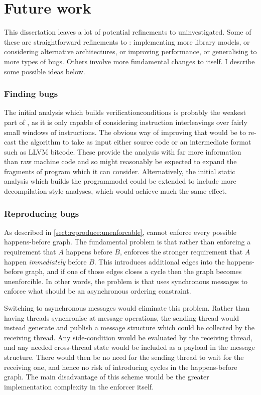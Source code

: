 \chapter{Future work}

This dissertation leaves a lot of potential refinements to
{\technique} uninvestigated.  Some of these are straightforward
refinements to {\implementation}: implementing more {\StateMachine}
library models, or considering alternative architectures, or improving
performance, or generalising to more types of bugs.  Others involve
more fundamental changes to {\technique} itself.  I describe some
possible ideas below.

\subsection{Finding bugs}

The initial analysis which builds \glspl{verificationcondition} is
probably the weakest part of {\technique}, as it is only capable of
considering instruction interleavings over fairly small windows of
instructions.  The obvious way of improving that would be to re-cast
the algorithm to take as input either source code or an intermediate
format such as LLVM bitcode\needCite{}.  These provide the analysis
with far more information than raw machine code and so might
reasonably be expected to expand the fragments of program which it can
consider.  Alternatively, the initial static analysis which builds the
\gls{programmodel} could be extended to include more
decompilation-style analyses, which would achieve much the same
effect.

\subsection{Reproducing bugs}

As described in \autoref{sect:reproduce:unenforcable}, {\technique}
cannot enforce every possible happens-before graph.  The fundamental
problem is that rather than enforcing a requirement that $A$ happens
before $B$, {\technique} enforces the stronger requirement that $A$
happen \emph{immediately} before $B$.  This introduces additional edges
into the happens-before graph, and if one of those edges closes a
cycle then the graph becomes unenforcible.  In other words, the
problem is that {\technique} uses synchronous messages to enforce what
should be an asynchronous ordering constraint.

Switching to asynchronous messages would eliminate this problem.
Rather than having threads synchronise at message operations, the
sending thread would instead generate and publish a message structure
which could be collected by the receiving thread.  Any side-condition
would be evaluated by the receiving thread, and any needed
cross-thread state would be included as a payload in the message
structure.  There would then be no need for the sending thread to wait
for the receiving one, and hence no risk of introducing cycles in the
happens-before graph.  The main disadvantage of this scheme would be
the greater implementation complexity in the enforcer itself.

